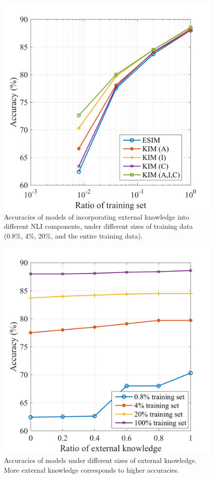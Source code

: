 \documentclass[11pt,a4paper]{article}
\begin{document}
\begin{figure}[!htb]
	\centering
	\includegraphics[width=0.8\linewidth]{curve_1}
	\caption{Accuracies of models of incorporating external knowledge into different NLI components, under different sizes of training data (0.8\%, 4\%, 20\%, and the entire training data).}
	\label{fig:curve1}
\end{figure}

\begin{figure}[!htb]
	\centering
	\includegraphics[width=0.8\linewidth]{curve_2}
	\caption{Accuracies of models under different sizes of external knowledge. More external knowledge corresponds to higher accuracies.}
	\label{fig:curve2}
\end{figure}
\end{document}
